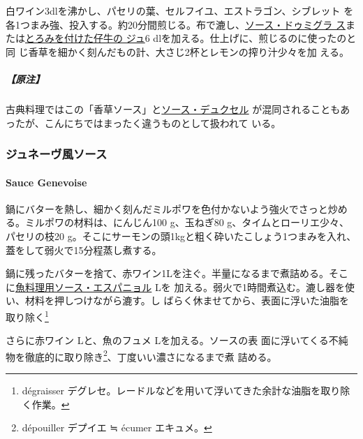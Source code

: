 \begin{recette}
白ワイン3dlを沸かし、パセリの葉、セルフイユ、エストラゴン、シブレット
を各1つまみ強、投入する。約20分間煎じる。布で漉し、\protect\hyperlink{sauce-demi-glace}{ソース・ドゥミグラ
ス}または\protect\hyperlink{jus-de-veau-lie}{とろみを付けた仔牛の ジュ}6
dlを加える。仕上げに、煎じるのに使ったのと同
じ香草を細かく刻んだもの計、大さじ2\undemi{}杯とレモンの搾り汁少々を加
える。

\hypertarget{ux539fux6ce8-2}{%
\subparagraph{【原注】}\label{ux539fux6ce8-2}}

古典料理ではこの「香草ソース」と\protect\hyperlink{sauce-duxelles}{ソース・デュクセル}
が混同されることもあったが、こんにちではまったく違うものとして扱われて
いる。

\maeaki

\hypertarget{ux30b8ux30e5ux30cdux30fcux30f4ux98a8ux30bdux30fcux30b9}{%
\subsubsection{ジュネーヴ風ソース}\label{ux30b8ux30e5ux30cdux30fcux30f4ux98a8ux30bdux30fcux30b9}}

\hypertarget{sauce-genevoise}{%
\paragraph{Sauce Genevoise}\label{sauce-genevoise}}


鍋にバターを熱し、細かく刻んだミルポワを色付かないよう強火でさっと炒め
る。ミルポワの材料は、にんじん100 g、玉ねぎ80 g、タイムとローリエ少々、
パセリの枝20 g。そこにサーモンの頭1kgと粗く砕いたこしょう1つまみを入れ、
蓋をして弱火で15分程蒸し煮する。

鍋に残ったバターを捨て、赤ワイン1Lを注ぐ。半量になるまで煮詰める。そこ
に\protect\hyperlink{sauce-espagnole-maigre}{魚料理用ソース・エスパニョル}\undemi{}
Lを
加える。弱火で1時間煮込む。漉し器を使い、材料を押しつけながら漉す。し
ばらく休ませてから、表面に浮いた油脂を取り除く\footnote{dégraisser
  デグレセ。レードルなどを用いて浮いてきた余計な油脂を取り除く作業。}

さらに赤ワイン\undemi{} Lと、魚のフュメ\undemi{} Lを加える。ソースの表
面に浮いてくる不純物を徹底的に取り除き\footnote{dépouiller デプイエ ≒
  écumer エキュメ。}、丁度いい濃さになるまで煮 詰める。


\end{recette}
